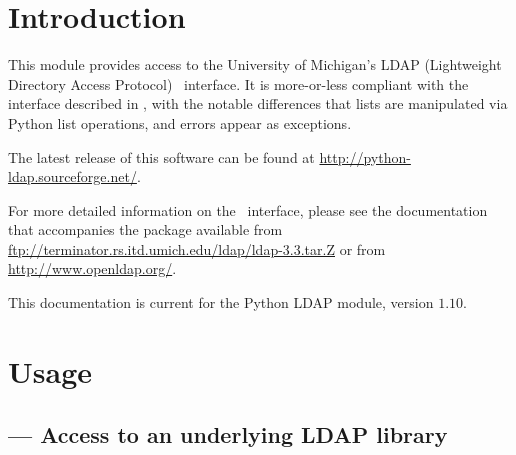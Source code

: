 
\chapter{Introduction}

This module provides access to the University of Michigan's LDAP 
(Lightweight Directory Access Protocol) \C\ interface. 
It is more-or-less compliant with the interface described in ,
with the notable differences that lists are manipulated via Python
list operations, and errors appear as exceptions.

The latest release of this software can be found at
\url{http://python-ldap.sourceforge.net/}.

For more detailed information on the \C\ interface, 
please see the documentation that accompanies the package available from
\url{ftp://terminator.rs.itd.umich.edu/ldap/ldap-3.3.tar.Z}
or from
\url{http://www.openldap.org/}.

This documentation is current for the Python LDAP module, version
$1.10$.

\chapter{Usage}

\section{ --- 
	Access to an underlying LDAP library}








